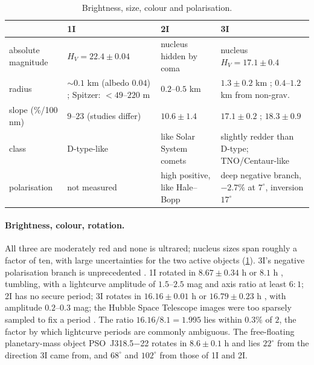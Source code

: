 \documentclass[11pt]{article}
\theoremstyle{definition}\newtheorem{definition}[theorem]{Definition}
\theoremstyle{remark}\newtheorem{remark}[theorem]{Remark}
\begin{document}
\begin{table}[!htb]\centering\small\setlength{\tabcolsep}{4pt}
\begin{tabular}{@{}>{\raggedright\arraybackslash}p{2.4cm}>{\raggedright\arraybackslash}p{3.7cm}>{\raggedright\arraybackslash}p{3.7cm}>{\raggedright\arraybackslash}p{4.5cm}@{}}\toprule
 & 1I & 2I & 3I\\\midrule
absolute magnitude & $H_V=22.4\pm0.04$ \cite{ISSI19} & nucleus hidden by coma & nucleus $H_V=17.1\pm0.4$ \cite{Hui26}\\
radius & $\sim0.1$ km (albedo $0.04$) \cite{Meech17}; Spitzer: $<49$--$220$ m \cite{Trilling18} & $0.2$--$0.5$ km \cite{Jewitt20} & $1.3\pm0.2$ km \cite{Hui26}; $0.4$--$1.2$ km from non-grav.\ \cite{Thoss26}\\
slope (\%/100 nm) & $9$--$23$ (studies differ) \cite{ISSI19} & $10.6\pm1.4$ \cite{Hui20} & $17.1\pm0.2$ \cite{Seligman25}; $18.3\pm0.9$ \cite{dlFM25}\\
class & D-type-like & like Solar System comets & slightly redder than D-type; TNO/Centaur-like\\
polarisation & not measured & high positive, like Hale--Bopp \cite{Bagnulo21} & deep negative branch, $-2.7\%$ at $7^\circ$, inversion $17^\circ$ \cite{Gray25}\\\bottomrule
\end{tabular}
\caption{Brightness, size, colour and polarisation.}\label{tab:isophot}
\end{table}

\paragraph{Brightness, colour, rotation.} All three are moderately red and none is ultrared; nucleus sizes span roughly a factor of ten, with large uncertainties for the two active objects (\cref{tab:isophot}). 3I's negative polarisation branch is unprecedented \cite{Gray25}. 1I rotated in $8.67\pm0.34$ h \cite{ISSI19} or $8.1$ h \cite{Bolin18}, tumbling, with a lightcurve amplitude of $1.5$--$2.5$ mag and axis ratio at least $6{:}1$; 2I has no secure period; 3I rotates in $16.16\pm0.01$ h \cite{SantanaRos25} or $16.79\pm0.23$ h \cite{dlFM25}, with amplitude $0.2$--$0.3$ mag; the Hubble Space Telescope images were too sparsely sampled to fix a period \cite{Hui26}. The ratio $16.16/8.1=1.995$ lies within $0.3\%$ of $2$, the factor by which lightcurve periods are commonly ambiguous. The free-floating planetary-mass object PSO~J318.5$-$22 rotates in $8.6\pm0.1$ h \cite{Biller18} and lies $22^\circ$ from the direction 3I came from, and $68^\circ$ and $102^\circ$ from those of 1I and 2I.
\end{document}
